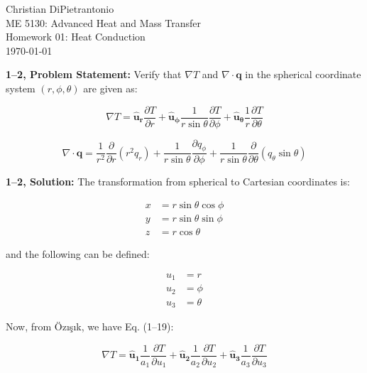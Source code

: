 \documentclass[letterpaper,12pt]{article}
\begin{document}
Christian DiPietrantonio \\
ME 5130: Advanced Heat and Mass Transfer \\
Homework 01: Heat Conduction \\
\today

\vspace{6pt}

\textbf{1--2, Problem Statement:}
Verify that $\nabla T$ and $\nabla \cdot \mathbf{q}$ in the spherical coordinate system $\left(r, \phi, \theta \right)$ are given as:

\begin{equation}
    \nabla T = \mathbf{\hat{u}_r} \frac{\partial T}{\partial r} + \mathbf{\hat{u}_{\phi}} \frac{1}{r \sin \theta} \frac{\partial T}{\partial \phi} + \mathbf{\hat{u}_{\theta}} \frac{1}{r} \frac{\partial T} {\partial \theta}
\end{equation}

\begin{equation}
    \nabla \cdot \mathbf{q} = \frac{1}{r^2} \frac{\partial}{\partial r} \left(r^2 q_r \right) + \frac{1}{r \sin \theta} \frac{\partial q_{\phi}}{\partial \phi} + \frac{1}{r \sin \theta} \frac{\partial}{\partial \theta} \left( q_{\theta} \sin \theta \right)
\end{equation}

\vspace{6pt}

\textbf{1--2, Solution:}
The transformation from spherical to Cartesian coordinates is:

\begin{equation}
\begin{aligned}
    x &= r\sin{\theta}\cos{\phi} \\
    y &= r\sin{\theta}\sin{\phi} \\
    z &= r\cos{\theta}
\end{aligned}
\end{equation}

and the following can be defined:

\begin{equation}
\begin{aligned}
    u_1 &= r \\
    u_2 &= \phi \\
    u_3 &= \theta
\end{aligned}
\end{equation}

Now, from \"Oz\i \c{s}\i k, we have Eq. (1--19):

\begin{equation}
    \nabla T = \mathbf{\hat{u}_1} \frac{1}{a_1} \frac{\partial T}{\partial u_1} + \mathbf{\hat{u}_2} \frac{1}{a_2} \frac{\partial T}{\partial u_2} + \mathbf{\hat{u}_3} \frac{1}{a_3} \frac{\partial T}{\partial u_3}
\end{equation}
\end{document}
